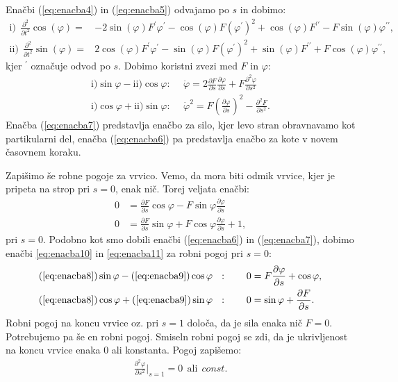\documentclass[12pt,a4paper]{article}
\begin{document}
Enačbi (\ref{eq:enacba4}) in (\ref{eq:enacba5}) odvajamo po $s$ in dobimo:
\begin{align}
 \textrm{i)} \ \  \frac{\partial ^{2}}{ \partial t ^{2}} \cos(\varphi)=& - 2 \sin(\varphi) F^{\prime} \varphi ^{\prime} - \cos (\varphi) F (\varphi ^{\prime})^{2} + \cos(\varphi) F^{\prime \prime} - F \sin(\varphi) \varphi ^{\prime \prime},  \nonumber \\
 \textrm{ii)} \ \  \frac{\partial ^{2}}{ \partial t ^{2}} \sin(\varphi)=& 2 \cos(\varphi) F^{\prime} \varphi ^{\prime} - \sin (\varphi) F (\varphi ^{\prime})^{2} + \sin(\varphi) F^{\prime \prime} + F \cos(\varphi) \varphi ^{\prime \prime},  \nonumber
\end{align}
kjer $^{\prime}$ označuje odvod po $s$. Dobimo koristni zvezi med $F$ in $\varphi$:
\begin{align}
\textrm{i)} \sin \varphi - \textrm{ii)} \cos \varphi: \ \ & \ddot{\varphi} = 2 \frac{\partial F}{\partial s} \frac{ \partial \varphi}{\partial s} + F \frac{\partial ^{2} \varphi}{\partial s^{2}}  \label{eq:enacba6} \\
\textrm{i)} \cos \varphi + \textrm{ii)} \sin \varphi: \ \ & \dot{\varphi}^{2} = F \left( \frac{\partial \varphi}{\partial s} \right)^{2} - \frac{\partial ^{2} F}{\partial s^{2}}. \label{eq:enacba7}
\end{align}
Enačba (\ref{eq:enacba7}) predstavlja enačbo za silo, kjer levo stran obravnavamo kot partikularni del, enačba (\ref{eq:enacba6}) pa predstavlja enačbo za kote v novem časovnem koraku.

Zapišimo še robne pogoje za vrvico. Vemo, da mora biti odmik vrvice, kjer je pripeta na strop pri $s=0$, enak nič. Torej veljata enačbi:
\begin{align}
0 &= \frac{\partial F}{\partial s} \cos \varphi - F \sin \varphi \frac{ \partial \varphi}{\partial s} \label{eq:enacba8}\\
0 &= \frac{\partial F}{\partial s} \sin \varphi + F \cos \varphi \frac{ \partial \varphi}{\partial s} +1, \label{eq:enacba9}
\end{align}
pri $s=0$. Podobno kot smo dobili enačbi (\ref{eq:enacba6}) in (\ref{eq:enacba7}), dobimo enačbi \ref{eq:enacba10} in \ref{eq:enacba11} za robni pogoj pri $s=0$:
\begin{align}
(\ref{eq:enacba8}) \sin \varphi - (\ref{eq:enacba9}) \cos \varphi \ \ : \qquad  0& = F \frac{\partial \varphi}{\partial s} + \cos \varphi, \label{eq:enacba10} \\
(\ref{eq:enacba8}) \cos \varphi + (\ref{eq:enacba9}) \sin \varphi \ \ : \qquad  0& = \sin \varphi + \frac{\partial F}{\partial s}. \label{eq:enacba11}
\end{align}
Robni pogoj na koncu vrvice oz. pri $s=1$ določa, da je sila enaka nič $F=0$. Potrebujemo pa še en robni pogoj. Smiseln robni pogoj se zdi, da je ukrivljenost na koncu vrvice enaka 0 ali konstanta. Pogoj zapišemo:
\begin{align*}
\frac{\partial ^{2} \varphi}{\partial s^{2}} \Big|_{s=1}=0  \ \ \textrm{ali} \ \ const.
\end{align*}
\end{document}
